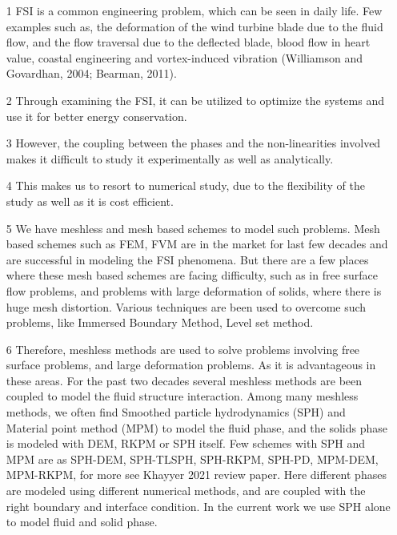\documentclass[10pt, conference]{FMFP2022}
\begin{document}
\begin{itemize}
\item [1] FSI is a common engineering problem, which can be seen in daily life.
  Few examples such as, the deformation of the wind turbine blade due to the
  fluid flow, and the flow traversal due to the deflected blade, blood flow in
  heart value, coastal engineering and vortex-induced vibration (Williamson and
  Govardhan, 2004; Bearman, 2011).
\item [2] Through examining the FSI, it can be utilized to optimize the systems
  and use it for better energy conservation.
\item [3] However, the coupling between the phases and the non-linearities involved
  makes it difficult to study it experimentally as well as analytically.
\item [4] This makes us to resort to numerical study, due to the flexibility of
  the study as well as it is cost efficient.
\item [5] We have meshless and mesh based schemes to model such problems. Mesh
  based schemes such as FEM, FVM are in the market for last few decades and are
  successful in modeling the FSI phenomena. But there are a few places where
  these mesh based schemes are facing difficulty, such as in free surface flow
  problems, and problems with large deformation of solids, where there is huge
  mesh distortion. Various techniques are been used to overcome such problems,
  like Immersed Boundary Method, Level set method.
\item [6] Therefore, meshless methods are used to solve problems involving free
  surface problems, and large deformation problems. As it is advantageous in
  these areas. For the past two decades several meshless methods are been
  coupled to model the fluid structure interaction. Among many meshless methods,
  we often find Smoothed particle hydrodynamics (SPH) and Material point method
  (MPM) to model the fluid phase, and the solids phase is modeled with DEM, RKPM
  or SPH itself. Few schemes with SPH and MPM are as SPH-DEM, SPH-TLSPH,
  SPH-RKPM, SPH-PD, MPM-DEM, MPM-RKPM, for more see Khayyer 2021 review paper.
  Here different phases are modeled using different numerical methods, and are
  coupled with the right boundary and interface condition. In the current work
  we use SPH alone to model fluid and solid phase.
\end{itemize}
\end{document}

